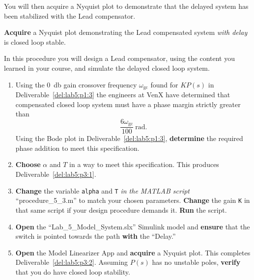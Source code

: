 %
You will then acquire a Nyquist plot to demonstrate that the delayed system has been stabilized with the Lead compensator.
%
\begin{deliverable}[label={del:lab5:p3:2}]
  \textbf{Acquire} a Nyquist plot demonstrating the Lead compensated system \emph{with delay} is closed loop stable.
\end{deliverable}
%
\begin{procedure}[label={proc:lab5:3}]
  In this procedure you will design a Lead compensator, using the content you learned in your course, and simulate the delayed closed loop system.
  \begin{enumerate}[label={(\arabic*)}]
    \item{%
      Using the \SI{0}{\decibel} gain crossover frequency \(\omega_\mathrm{gc}\) found for \(K P(s)\) in Deliverable~\ref{del:lab5:p1:3} the engineers at VenX have determined that compensated closed loop system must have a phase margin strictly greater than
      \[
        \frac{6\omega_\mathrm{gc}}{100}~\mathrm{rad}.
      \]
      Using the Bode plot in Deliverable~\ref{del:lab5:p1:3}, \textbf{determine} the required phase addition to meet this specification.
    }
    \item{%
      \textbf{Choose} \(\alpha\) and \(T\) in a way to meet this specification.
      This produces Deliverable~\ref{del:lab5:p3:1}.
    }
    \item{%
      \textbf{Change} the variable \texttt{alpha} and \texttt{T} \emph{in the MATLAB script} ``procedure\_5\_3.m'' to match your chosen parameters.
      \textbf{Change} the gain \texttt{K} in that same script if your design procedure demands it.
      \textbf{Run} the script.
    }
    \item{%
      \textbf{Open} the ``Lab\_5\_Model\_System.slx'' Simulink model and \textbf{ensure} that the switch is pointed towards the path \textbf{with} the ``Delay.''
    }
    \item{%
      \textbf{Open} the Model Linearizer App and \textbf{acquire} a Nyquist plot.
      This completes Deliverable~\ref{del:lab5:p3:2}.
      Assuming \(P(s)\) has no unstable poles, \textbf{verify} that you do  have closed loop stability.
    }
  \end{enumerate}
\end{procedure}

